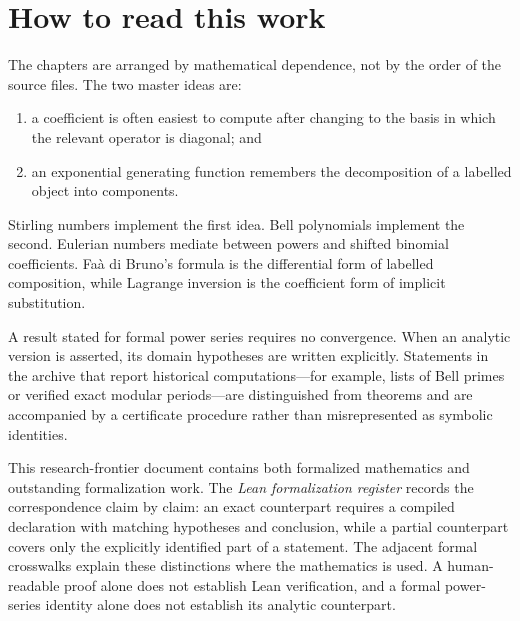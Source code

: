 \documentclass[11pt,a4paper,oneside,openany]{book}
\theoremstyle{definition}
\theoremstyle{remark}
\begin{document}
\chapter*{How to read this work}
The chapters are arranged by mathematical dependence, not by the order of the source
files.  The two master ideas are:
\begin{enumerate}
  \item a coefficient is often easiest to compute after changing to the basis in
        which the relevant operator is diagonal; and
  \item an exponential generating function remembers the decomposition of a
        labelled object into components.
\end{enumerate}
Stirling numbers implement the first idea.  Bell polynomials implement the second.
Eulerian numbers mediate between powers and shifted binomial coefficients.  Fa\`a di
Bruno's formula is the differential form of labelled composition, while Lagrange
inversion is the coefficient form of implicit substitution.

A result stated for formal power series requires no convergence.  When an analytic
version is asserted, its domain hypotheses are written explicitly.  Statements in
the archive that report historical computations---for example, lists of Bell
primes or verified exact modular periods---are distinguished from theorems and are
accompanied by a certificate procedure rather than misrepresented as symbolic
identities.

This research-frontier document contains both formalized mathematics and
outstanding formalization work.  The \emph{Lean formalization register} records
the correspondence claim by claim: an exact counterpart requires a compiled
declaration with matching hypotheses and conclusion, while a partial counterpart
covers only the explicitly identified part of a statement.  The adjacent formal
crosswalks explain these distinctions where the mathematics is used.  A
human-readable proof alone does not establish Lean verification, and a formal
power-series identity alone does not establish its analytic counterpart.
\end{document}

